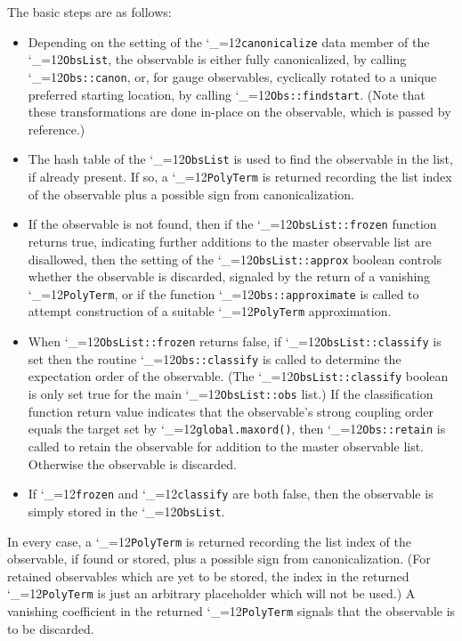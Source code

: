 \documentclass [12pt]{article}
\makeatletter
\renewcommand{\tt}{\begingroup\catcode`_=12\def\_{\string_}\tt@}
\newcommand{\tt@}[1]{\texttt{#1}\endgroup}
\makeatother
\begin{document}
\begin{itemize}
    The basic steps are as follows:
    \begin{itemize}
    \item
	Depending on the setting of the
	\tt{canonicalize} data member of the
	\tt{ObsList}, the observable is either
	fully canonicalized, by calling \tt{Obs::canon},
	or, for gauge observables, cyclically rotated
	to a unique preferred starting location,
	by calling \tt{Obs::findstart}.
	(Note that these transformations are done
	in-place on the observable, which is passed by reference.)
    \item
	The hash table of the \tt{ObsList} is used
	to find the observable in the list, if already
	present.
	If so, a \tt{PolyTerm} is returned recording
	the list index of the observable
	plus a possible sign from canonicalization.
    \item
	If the observable is not found, then
	if the \tt{ObsList::frozen} function returns true,
	indicating further additions to the master observable
	list are disallowed, then the setting of the
	\tt{ObsList::approx} boolean controls
	whether the observable is discarded, signaled by the
	return of a vanishing \tt{PolyTerm}, or if the function
	\tt{Obs::approximate} is called to attempt
	construction of a suitable \tt{PolyTerm} approximation.
    \item
	When \tt{ObsList::frozen} returns false,
	if \tt{ObsList::classify} is set
	then the routine \tt{Obs::classify} is called to determine
	the expectation order of the observable.
	(The \tt{ObsList::classify} boolean is only set true for
	the main \tt{ObsList::obs} list.)
	If the classification function return value indicates that the
	observable's strong coupling order equals the target
	set by \tt{global.maxord()},
	then \tt{Obs::retain} is called to retain the observable
	for addition to the master observable list.
	Otherwise the observable is discarded.
    \item
	If \tt{frozen} and \tt{classify} are both false,
	then the observable is simply stored in the \tt{ObsList}.
    \end{itemize}
    In every case, a \tt{PolyTerm} is returned recording
    the list index of the observable, if found or stored,
    plus a possible sign from canonicalization.
    (For retained observables which are yet to be stored,
    the index in the returned \tt{PolyTerm} is just an
    arbitrary placeholder which will not be used.)
    A vanishing coefficient in the returned \tt{PolyTerm}
    signals that the observable is to be discarded.


\end{itemize}
\end{document}
